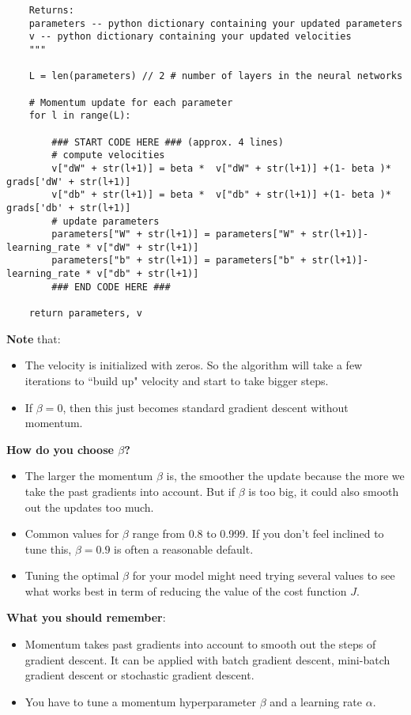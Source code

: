 {\begin{verbatim}
    Returns:
    parameters -- python dictionary containing your updated parameters 
    v -- python dictionary containing your updated velocities
    """

    L = len(parameters) // 2 # number of layers in the neural networks
    
    # Momentum update for each parameter
    for l in range(L):
        
        ### START CODE HERE ### (approx. 4 lines)
        # compute velocities
        v["dW" + str(l+1)] = beta *  v["dW" + str(l+1)] +(1- beta )* grads['dW' + str(l+1)]
        v["db" + str(l+1)] = beta *  v["db" + str(l+1)] +(1- beta )* grads['db' + str(l+1)]
        # update parameters
        parameters["W" + str(l+1)] = parameters["W" + str(l+1)]- learning_rate * v["dW" + str(l+1)]
        parameters["b" + str(l+1)] = parameters["b" + str(l+1)]- learning_rate * v["db" + str(l+1)]
        ### END CODE HERE ###
        
    return parameters, v
\end{verbatim}

{\textbf{Note}} that:
\begin{itemize}
\item The velocity is initialized with zeros. So the algorithm will take a few iterations to ``build up" velocity and start to take bigger steps.
\item If $\beta = 0$, then this just becomes standard gradient descent without momentum. 
\end{itemize}

{\textbf{How do you choose $\beta$?}}
\begin{itemize}
\item The larger the momentum $\beta$ is, the smoother the update because the more we take the past gradients into account. But if $\beta$ is too big, it could also smooth out the updates too much. 
\item Common values for $\beta$ range from 0.8 to 0.999. If you don't feel inclined to tune this, $\beta = 0.9$ is often a reasonable default. 
\item Tuning the optimal $\beta$ for your model might need trying several values to see what works best in term of reducing the value of the cost function $J$. 
\end{itemize}

{\color{red}\textbf{What you should remember}:
\begin{itemize}
\item Momentum takes past gradients into account to smooth out the steps of gradient descent. It can be applied with batch gradient descent, mini-batch gradient descent or stochastic gradient descent.
\item You have to tune a momentum hyperparameter $\beta$ and a learning rate $\alpha$.
\end{itemize}
}



}

